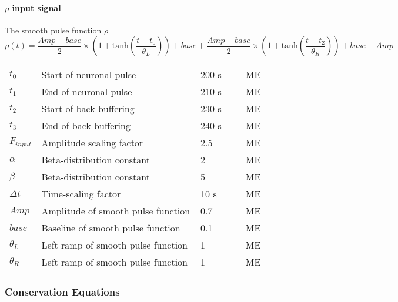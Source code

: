 \paragraph{$\rho$ input signal}
The smooth pulse function $\rho$
\begin{equation}
\rho(t) = \frac{Amp - base}{2}\times\left(1+\mathrm{tanh}\left(\frac{t-t_0}{\theta_L}\right)\right)+base+\frac{Amp-base}{2}\times\left(1+\mathrm{tanh}\left(\frac{t-t_2}{\theta_R}\right)\right)+base-Amp                      
\end{equation}
%
\begin{table}[h!]
\centering
\begin{tabular}{| p{0.09\linewidth} | >{\footnotesize} p{0.6\linewidth} | >{\footnotesize} p{0.17\linewidth} | >{\footnotesize} p{0.02\linewidth} |}
\arrayrulecolor{lightgrey}\hline
$t_0$ 			& Start of neuronal pulse	& 200 s &  ME  \\
$t_1$ 			& End of neuronal pulse	& 210 s &  ME  \\
$t_2$ 			& Start of back-buffering	& 230 s &  ME  \\
$t_3$ 			& End of back-buffering	& 240 s &  ME  \\
$F_{input}$ 	& Amplitude scaling factor 	& 2.5 	&  ME  \\
$\alpha$ 		& Beta-distribution constant	& 2 	&  ME  \\
$\beta$ 		& Beta-distribution constant	& 5 	&  ME  \\
$\Delta t$ 		& Time-scaling factor	& 10 s	&  ME  \\
$Amp$           & Amplitude of smooth pulse function & 0.7 & ME\\
$base$          & Baseline of smooth pulse function & 0.1 & ME\\
$\theta_L$      & Left ramp of smooth pulse function & 1 & ME\\
$\theta_R$      & Left ramp of smooth pulse function & 1 & ME\\
   
\hline
\end{tabular}
\end{table}

% 
\subsubsection{Conservation Equations}
